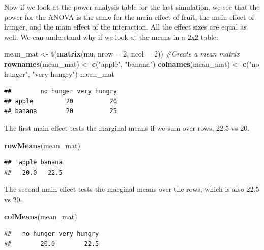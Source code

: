 \documentclass[]{book}
\newenvironment{Shaded}{\begin{snugshade}}{\end{snugshade}}
\newcommand{\CommentTok}[1]{\textcolor[rgb]{0.56,0.35,0.01}{\textit{#1}}}
\newcommand{\DataTypeTok}[1]{\textcolor[rgb]{0.13,0.29,0.53}{#1}}
\newcommand{\DecValTok}[1]{\textcolor[rgb]{0.00,0.00,0.81}{#1}}
\newcommand{\KeywordTok}[1]{\textcolor[rgb]{0.13,0.29,0.53}{\textbf{#1}}}
\newcommand{\NormalTok}[1]{#1}
\newcommand{\StringTok}[1]{\textcolor[rgb]{0.31,0.60,0.02}{#1}}
\begin{document}
Now if we look at the power analysis table for the last simulation, we see that the power for the ANOVA is the same for the main effect of fruit, the main effect of hunger, and the main effect of the interaction. All the effect sizes are equal as well. We can understand why if we look at the means in a 2x2 table:

\begin{Shaded}
\begin{Highlighting}[]
\NormalTok{mean_mat <-}\StringTok{ }\KeywordTok{t}\NormalTok{(}\KeywordTok{matrix}\NormalTok{(mu, }
                     \DataTypeTok{nrow =} \DecValTok{2}\NormalTok{,}
                     \DataTypeTok{ncol =} \DecValTok{2}\NormalTok{)) }\CommentTok{#Create a mean matrix}
\KeywordTok{rownames}\NormalTok{(mean_mat) <-}\StringTok{ }\KeywordTok{c}\NormalTok{(}\StringTok{"apple"}\NormalTok{, }\StringTok{"banana"}\NormalTok{)}
\KeywordTok{colnames}\NormalTok{(mean_mat) <-}\StringTok{ }\KeywordTok{c}\NormalTok{(}\StringTok{"no hunger"}\NormalTok{, }\StringTok{"very hungry"}\NormalTok{)}
\NormalTok{mean_mat}
\end{Highlighting}
\end{Shaded}

\begin{verbatim}
##        no hunger very hungry
## apple         20          20
## banana        20          25
\end{verbatim}

The first main effect tests the marginal means if we sum over rows, 22.5 vs 20.

\begin{Shaded}
\begin{Highlighting}[]
\KeywordTok{rowMeans}\NormalTok{(mean_mat)}
\end{Highlighting}
\end{Shaded}

\begin{verbatim}
##  apple banana 
##   20.0   22.5
\end{verbatim}

The second main effect tests the marginal means over the rows, which is also 22.5 vs 20.

\begin{Shaded}
\begin{Highlighting}[]
\KeywordTok{colMeans}\NormalTok{(mean_mat)}
\end{Highlighting}
\end{Shaded}

\begin{verbatim}
##   no hunger very hungry 
##        20.0        22.5
\end{verbatim}
\end{document}
